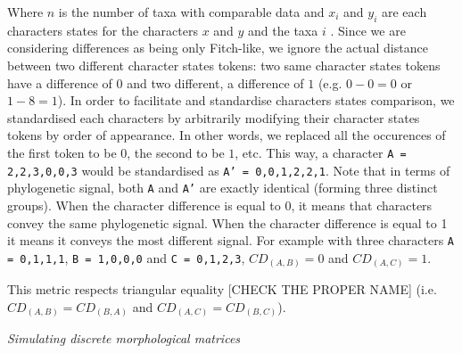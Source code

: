 \documentclass[12pt,letterpaper]{article}
\renewcommand{\subsection}[1]{%
\bigskip
\begin{center}
\begin{large}
\normalfont\itshape #1
\end{large}
\end{center}}
\begin{document}
\noindent Where $n$ is the number of taxa with comparable data and $x_i$ and $y_i$ are each characters states for the characters $x$ and $y$ and the taxa $i$ \citep[i.e. the Gower distance;][]{GowerDist}.
Since we are considering differences as being only Fitch-like, we ignore the actual distance between two different character states tokens: two same character states tokens have a difference of $0$ and two different, a difference of $1$ (e.g. $0 - 0 = 0$ or $1 - 8 = 1$).
In order to facilitate and standardise characters states comparison, we standardised each characters by arbitrarily modifying their character states tokens by order of appearance.
In other words, we replaced all the occurences of the first token to be $0$, the second to be $1$, etc.
This way, a character \texttt{A = {2,2,3,0,0,3}} would be standardised as \texttt{A' = {0,0,1,2,2,1}}. Note that in terms of phylogenetic signal, both \texttt{A} and \texttt{A'} are exactly identical (forming three distinct groups).
When the character difference is equal to $0$, it means that characters convey the same phylogenetic signal.
When the character difference is equal to 1 it means it conveys the most different signal.
For example with three characters \texttt{A = {0,1,1,1}}, \texttt{B = {1,0,0,0}} and \texttt{C = {0,1,2,3}}, $CD_{(A,B)} = 0$ and $CD_{(A,C)} = 1$.

This metric respects triangular equality [CHECK THE PROPER NAME] (i.e. $CD_{(A,B)} = CD_{(B,A)}$ and $CD_{(A,C)} = CD_{(B,C)}$).

\subsection{Simulating discrete morphological matrices}
\end{document}
